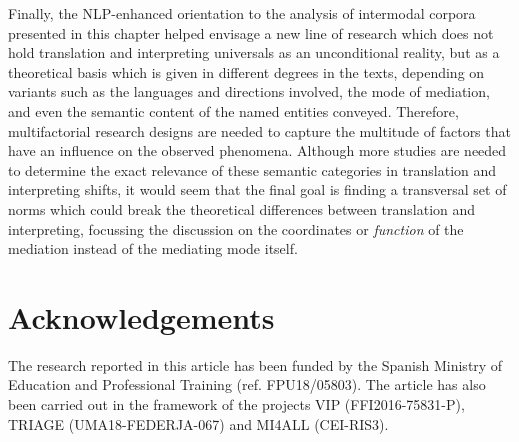 \documentclass[output=paper]{langscibook}
\begin{document}
Finally, the NLP-enhanced orientation to the analysis of intermodal corpora presented in this chapter helped envisage a new line of research which does not hold translation and interpreting universals as an unconditional reality, but as a theoretical basis which is given in different degrees in the texts, depending on variants such as the languages and directions involved, the mode of mediation, and even the semantic content of the named entities conveyed. Therefore, multifactorial research designs are needed to capture the multitude of factors that have an influence on the observed phenomena. Although more studies are needed to determine the exact relevance of these semantic categories in translation and interpreting shifts, it would seem that the final goal is finding a transversal set of norms which could break the theoretical differences between translation and interpreting, focussing the discussion on the coordinates or \textit{function} of the mediation instead of the mediating mode itself. 

\section*{Acknowledgements}

The research reported in this article has been funded by the Spanish Ministry of Education and Professional Training (ref. FPU18/05803). The article has also been carried out in the framework of the projects VIP (FFI2016-75831-P), TRIAGE (UMA18-FEDERJA-067) and MI4ALL (CEI-RIS3).

\sloppy\printbibliography[heading=subbibliography,notkeyword=this]
\end{document}
